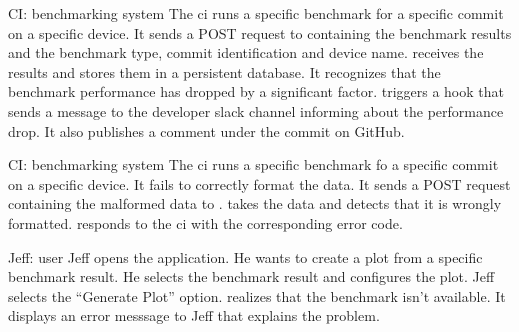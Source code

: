 {CI: \Gls{benchmarking system}}
{The \acrshort{ci} runs a specific \gls{benchmark} for a specific commit on a specific device. It sends a POST request to \parkview{} containing the \glspl{benchmark result} and the benchmark type, commit identification and device name. \parkview{} receives the results and stores them in a persistent database. It recognizes that the benchmark performance has dropped by a significant factor. \parkview{} triggers a hook that sends a message to the developer slack channel informing about the performance drop. It also publishes a comment under the commit on GitHub.}

{CI: \Gls{benchmarking system}}
{The \acrshort{ci} runs a specific \gls{benchmark} fo a specific commit on a specific device. It fails to correctly format the data. It sends a POST request containing the malformed data to \parkview{}. \parkview{} takes the data and detects that it is wrongly formatted. \parkview{} responds to the \acrshort{ci} with the corresponding error code.}

{Jeff: \Gls{user}}
{Jeff opens the application. He wants to create a \gls{plot} from a specific \gls{benchmark result}. He selects the benchmark result and configures the \gls{plot}. Jeff selects the \enquote{Generate Plot} option. \parkview{} realizes that the \gls{benchmark} isn't available. It displays an error messsage to Jeff that explains the problem.}

